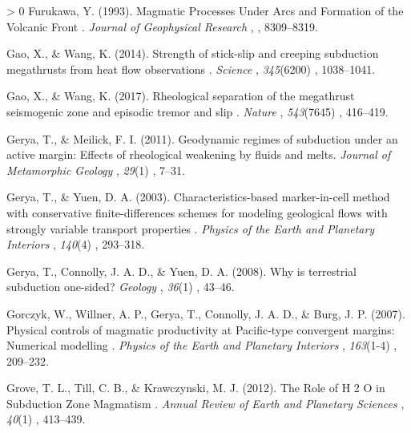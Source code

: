 \documentclass[draft,linenumbers]{agujournal2018} %
\newlength{\cslhangindent} %
\newenvironment{CSLReferences}[3] %
 {%
  \setlength{\parindent}{0pt} %
  \ifodd #1 \everypar{\setlength{\hangindent}{\cslhangindent}}\ignorespaces\fi %
  \ifnum #2 > 0 %
  \setlength{\parskip}{#2\baselineskip} %
  \fi %
 }%
 {} %
\providecommand{\DIFaddtex}[1]{{\protect\color{blue} \sf #1}} %
\providecommand{\DIFadd}[1]{\texorpdfstring{\DIFaddtex{#1}}{#1}} %
\begin{document}
\begin{CSLReferences}{1}{0}
\leavevmode\hypertarget{ref-Furukawa1993}{}%
\DIFadd{Furukawa, Y. (1993). }{\DIFadd{Magmatic Processes Under Arcs and Formation of the
Volcanic Front}}\DIFadd{. }\emph{\DIFadd{Journal of Geophysical Research}}\DIFadd{, }\emph{\DIFadd{98}}\DIFadd{,
8309--8319.
}

\leavevmode\hypertarget{ref-Gao2014}{}%
\DIFadd{Gao, X., \& Wang, K. (2014). }{\DIFadd{Strength of stick-slip and creeping
subduction megathrusts from heat flow observations}}\DIFadd{. }\emph{\DIFadd{Science}}\DIFadd{,
}\emph{345}(6200)\DIFadd{, 1038--1041.
}

\leavevmode\hypertarget{ref-Gao2017}{}%
\DIFadd{Gao, X., \& Wang, K. (2017). }{\DIFadd{Rheological separation of the megathrust
seismogenic zone and episodic tremor and slip}}\DIFadd{. }\emph{\DIFadd{Nature}}\DIFadd{,
}\emph{543}(7645)\DIFadd{, 416--419.
}

\leavevmode\hypertarget{ref-Gerya2011}{}%
\DIFadd{Gerya, T., \& Meilick, F. I. (2011). Geodynamic regimes of subduction
under an active margin: Effects of rheological weakening by fluids and
melts. }\emph{\DIFadd{Journal of Metamorphic Geology}}\DIFadd{, }\emph{29}(1)\DIFadd{, 7--31.
}

\leavevmode\hypertarget{ref-Gerya2003}{}%
\DIFadd{Gerya, T., \& Yuen, D. A. (2003). }{\DIFadd{Characteristics-based marker-in-cell
method with conservative finite-differences schemes for modeling
geological flows with strongly variable transport properties}}\DIFadd{.
}\emph{\DIFadd{Physics of the Earth and Planetary Interiors}}\DIFadd{, }\emph{140}(4)\DIFadd{,
293--318.
}

\leavevmode\hypertarget{ref-Gerya2008}{}%
\DIFadd{Gerya, T., Connolly, J. A. D., \& Yuen, D. A. (2008). }{\DIFadd{Why is
terrestrial subduction one-sided?}} \emph{\DIFadd{Geology}}\DIFadd{, }\emph{36}(1)\DIFadd{, 43--46.
}

\leavevmode\hypertarget{ref-Gorczyk2007}{}%
\DIFadd{Gorczyk, W., Willner, A. P., Gerya, T., Connolly, J. A. D., \& Burg, J.
P. (2007). }{\DIFadd{Physical controls of magmatic productivity at Pacific-type
convergent margins: Numerical modelling}}\DIFadd{. }\emph{\DIFadd{Physics of the Earth and
Planetary Interiors}}\DIFadd{, }\emph{163}(1-4)\DIFadd{, 209--232.
}

\leavevmode\hypertarget{ref-Grove2012}{}%
\DIFadd{Grove, T. L., Till, C. B., \& Krawczynski, M. J. (2012). }{\DIFadd{The Role of H
2 O in Subduction Zone Magmatism}}\DIFadd{. }\emph{\DIFadd{Annual Review of Earth and
Planetary Sciences}}\DIFadd{, }\emph{40}(1)\DIFadd{, 413--439.
}


\end{CSLReferences}
\end{document}
